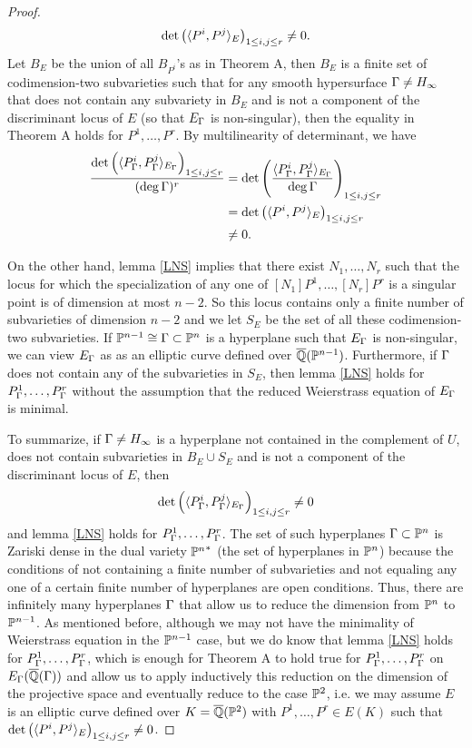 \documentclass[12pt,reqno]{amsart}
\begin{document}
\begin{proof}
$$ \det \left(\langle P^i, P^j\rangle_E\right)_{1\leq i,j\leq r} \neq 0.$$ Let $B_E$ be the union of all $B_{P^i}$'s as in Theorem A, then $B_E$ is a finite set of codimension-two subvarieties such that for any smooth hypersurface $\Gamma \neq H_\infty$ that does not contain any subvariety in $B_E$ and is not a component of the discriminant locus of $E$ (so that $E_\Gamma$ is non-singular), then the equality in Theorem A holds for $P^1, \ldots, P^r$. By multilinearity of determinant, we have
\begin{align*}   \frac{\det \left( \langle P^i_\Gamma, P^j_\Gamma\rangle_{E_\Gamma} \right)_{1\leq i,j\leq r}}{(\deg \Gamma)^r} &=\det\left( \frac{\langle P^i_\Gamma, P^j_\Gamma\rangle_{E_\Gamma}}{\deg\Gamma} \right)_{1\leq i,j\leq r} \\
&=\det \left(\langle P^i, P^j\rangle_E\right)_{1\leq i,j\leq r}\\
&\neq 0.
\end{align*}

On the other hand, lemma \ref{LNS} implies that there exist $N_1, \ldots, N_r$ such that the locus for which the specialization of any one of $[N_1]P^1, \ldots, [N_r]P^r$ is a singular point is of dimension at most $n-2$. So this locus contains only a finite number of subvarieties of dimension $n-2$ and we let $S_E$ be the set of all these codimension-two subvarieties. If $\mathbb{P}^{n-1}\cong\Gamma \subset \mathbb{P}^n$ is a hyperplane such that $E_\Gamma$ is non-singular, we can view $E_\Gamma$ as as an elliptic curve defined over $\overline{\mathbb{Q}}(\mathbb{P}^{n-1})$. Furthermore, if $\Gamma$ does not contain any of the subvarieties in $S_E$, then lemma \ref{LNS} holds for $P^1_\Gamma, \ldots, P^r_\Gamma$ without the assumption that the reduced Weierstrass equation of $E_\Gamma$ is minimal. 



To summarize, if $\Gamma \neq H_\infty$ is a hyperplane not contained in the complement of $U$, does not contain subvarieties in $B_E \cup S_E$ and is not a component of the discriminant locus of $E$, then \begin{equation}\det \left( \langle P^i_\Gamma, P^j_\Gamma\rangle_{E_\Gamma} \right)_{1\leq i,j\leq r} \neq 0 \label{LIG}\end{equation} and lemma \ref{LNS} holds for $P^1_\Gamma, \ldots, P^r_\Gamma$. The set of such hyperplanes $\Gamma \subset \mathbb{P}^n$ is Zariski dense in the dual variety ${\mathbb{P}^n}^*$ (the set of hyperplanes in $\mathbb{P}^n$) because the conditions of not containing a finite number of subvarieties and not equaling any one of a certain finite number of hyperplanes are open conditions. Thus, there are infinitely many hyperplanes $\Gamma$ that allow us to reduce the dimension from $\mathbb{P}^n$ to $\mathbb{P}^{n-1}$. As mentioned before, although we may not have the minimality of Weierstrass equation in the $\mathbb{P}^{n-1}$ case, but we do know that lemma \ref{LNS} holds for $P^1_\Gamma, \ldots, P^r_\Gamma$, which is enough for Theorem A to hold true for $P^1_\Gamma, \ldots, P^r_\Gamma$ on $E_\Gamma(\overline{\mathbb{Q}}(\Gamma))$ and allow us to apply inductively this reduction on the dimension of the projective space and eventually reduce to the case $\mathbb{P}^2$, i.e. we may assume $E$ is an elliptic curve defined over $K=\overline{\mathbb{Q}}(\mathbb{P}^2)$ with $P^1, \ldots, P^r \in E(K)$ such that $\det \left( \langle P^i, P^j\rangle_{E} \right)_{1\leq i,j\leq r} \neq 0$. 


\end{proof}
\end{document}
